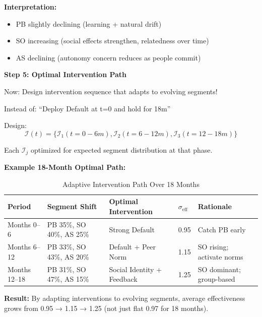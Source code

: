 \textbf{Interpretation:}
\begin{itemize}[nosep]
\item PB slightly declining (learning + natural drift)
\item SO increasing (social effects strengthen, relatedness over time)
\item AS declining (autonomy concern reduces as people commit)
\end{itemize}

\textbf{Step 5: Optimal Intervention Path}

Now: Design intervention sequence that adapts to evolving segments!

\begin{definition}
\label{def:19-intervention-path}

Instead of: ``Deploy Default at t=0 and hold for 18m''

Design:
\begin{equation}
\mathcal{I}(t) = \{\mathcal{I}_1 (t=0-6m), \mathcal{I}_2 (t=6-12m), \mathcal{I}_3 (t=12-18m)\}
\end{equation}

Each $\mathcal{I}_j$ optimized for expected segment distribution at that phase.

\end{definition}

\textbf{Example 18-Month Optimal Path:}

\begin{table}[htbp]
\centering
\caption{Adaptive Intervention Path Over 18 Months}
\label{tab:19-optimal-path}
\renewcommand{\arraystretch}{1.4}
\small
\begin{tabular}{@{}lllll@{}}
\toprule
\textbf{Period} & \textbf{Segment Shift} & \textbf{Optimal Intervention} & \textbf{$\sigma_{\text{eff}}$} & \textbf{Rationale} \\
\midrule
Months 0--6 & PB 35\%, SO 40\%, AS 25\% & Strong Default & 0.95 & Catch PB early \\
Months 6--12 & PB 33\%, SO 43\%, AS 20\% & Default + Peer Norm & 1.15 & SO rising; activate norms \\
Months 12--18 & PB 31\%, SO 47\%, AS 15\% & Social Identity + Feedback & 1.25 & SO dominant; group-based \\
\bottomrule
\end{tabular}
\end{table}

\textbf{Result:} By adapting interventions to evolving segments, average effectiveness grows from 0.95 → 1.15 → 1.25 (not just flat 0.97 for 18 months).

